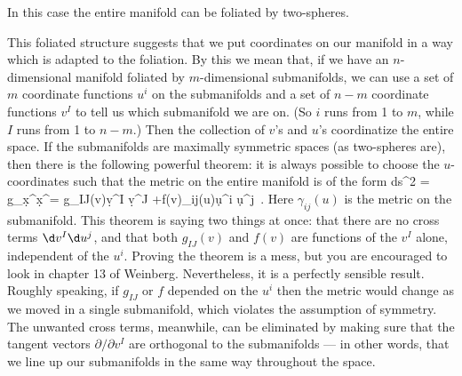 \noindent In this case the entire manifold can be foliated by two-spheres.

This foliated structure suggests that we put coordinates on our manifold
in a way which is adapted to the foliation.  By this we mean that, if
we have an $n$-dimensional manifold foliated by $m$-dimensional 
submanifolds, we can use a set of $m$ coordinate functions $u^i$ on
the submanifolds and a set of $n-m$ coordinate functions $v^I$ to tell
us which submanifold we are on.  (So $i$ runs from 1 to $m$, while
$I$ runs from 1 to $n-m$.)  Then the collection of $v$'s and $u$'s 
coordinatize the entire space.  If the submanifolds are maximally
symmetric spaces (as two-spheres are), then there is the following
powerful theorem: it is always possible to choose the $u$-coordinates
such that the metric on the entire manifold is of the form
\be
  ds^2 = g_\mn \d x^\mu \d x^\nu = g_{IJ}(v)\d v^I \d v^J
  +f(v)\gamma_{ij}(u)\d u^i \d u^j\ .\label{7.2}
\ee
Here $\gamma_{ij}(u)$ is the metric on the submanifold.
This theorem is saying two things at once: that there are no cross
terms $\d v^I \d u^j$, and that both $g_{IJ}(v)$ and $f(v)$ are functions
of the $v^I$ alone, independent of the $u^i$.  Proving the theorem is
a mess, but you are encouraged to look in chapter 13 of Weinberg.
Nevertheless, it is a perfectly sensible result.  Roughly speaking,
if $g_{IJ}$ or $f$ depended on the $u^i$ then the metric would change
as we moved in a single submanifold, which violates the assumption of
symmetry.  The unwanted cross terms, meanwhile, can be eliminated by
making sure that the tangent vectors $\partial/\partial v^I$ are
orthogonal to the submanifolds --- in other words, that 
we line up our submanifolds in the same way throughout the space.

